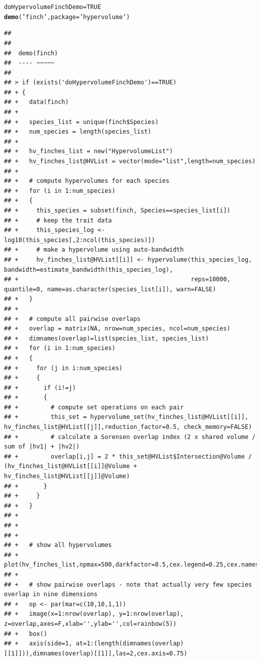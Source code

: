 \documentclass[12pt]{article}\usepackage[]{graphicx}\usepackage[]{color}
\makeatletter
\newcommand{\hlnum}[1]{\textcolor[rgb]{0.686,0.059,0.569}{#1}}%
\newcommand{\hlstr}[1]{\textcolor[rgb]{0.192,0.494,0.8}{#1}}%
\newcommand{\hlstd}[1]{\textcolor[rgb]{0.345,0.345,0.345}{#1}}%
\newcommand{\hlkwb}[1]{\textcolor[rgb]{0.69,0.353,0.396}{#1}}%
\newcommand{\hlkwc}[1]{\textcolor[rgb]{0.333,0.667,0.333}{#1}}%
\newcommand{\hlkwd}[1]{\textcolor[rgb]{0.737,0.353,0.396}{\textbf{#1}}}%
\newenvironment{kframe}{%
 \def\at@end@of@kframe{}%
 \ifinner\ifhmode%
  \def\at@end@of@kframe{\end{minipage}}%
  \begin{minipage}{\columnwidth}%
 \fi\fi%
 \def\FrameCommand##1{\hskip\@totalleftmargin \hskip-\fboxsep
 \colorbox{shadecolor}{##1}\hskip-\fboxsep
     \hskip-\linewidth \hskip-\@totalleftmargin \hskip\columnwidth}%
 \MakeFramed {\advance\hsize-\width
   \@totalleftmargin\z@ \linewidth\hsize
   \@setminipage}}%
 {\par\unskip\endMakeFramed%
 \at@end@of@kframe}
\newenvironment{knitrout}{}{} %
\makeatother
\begin{document}
\begin{knitrout}
\color{fgcolor}\begin{kframe}
\begin{alltt}
\hlstd{doHypervolumeFinchDemo}\hlkwb{=}\hlnum{TRUE}
\hlkwd{demo}\hlstd{(}\hlstr{'finch'}\hlstd{,} \hlkwc{package} \hlstd{=} \hlstr{'hypervolume'}\hlstd{)}
\end{alltt}
\begin{verbatim}
## 
## 
## 	demo(finch)
## 	---- ~~~~~
## 
## > if (exists('doHypervolumeFinchDemo')==TRUE)
## + {
## +   data(finch)
## +   
## +   species_list = unique(finch$Species)
## +   num_species = length(species_list)
## +   
## +   hv_finches_list = new("HypervolumeList")
## +   hv_finches_list@HVList = vector(mode="list",length=num_species)
## +   
## +   # compute hypervolumes for each species
## +   for (i in 1:num_species)
## +   {
## +     this_species = subset(finch, Species==species_list[i])
## +     # keep the trait data
## +     this_species_log <- log10(this_species[,2:ncol(this_species)])
## +     # make a hypervolume using auto-bandwidth
## +     hv_finches_list@HVList[[i]] <- hypervolume(this_species_log, bandwidth=estimate_bandwidth(this_species_log),
## +                                                reps=10000, quantile=0, name=as.character(species_list[i]), warn=FALSE)
## +   }
## +   
## +   # compute all pairwise overlaps
## +   overlap = matrix(NA, nrow=num_species, ncol=num_species)
## +   dimnames(overlap)=list(species_list, species_list)
## +   for (i in 1:num_species)
## +   {
## +     for (j in i:num_species)
## +     {
## +       if (i!=j)
## +       {
## +         # compute set operations on each pair
## +         this_set = hypervolume_set(hv_finches_list@HVList[[i]], hv_finches_list@HVList[[j]],reduction_factor=0.5, check_memory=FALSE)
## +         # calculate a Sorensen overlap index (2 x shared volume / sum of |hv1| + |hv2|)
## +         overlap[i,j] = 2 * this_set@HVList$Intersection@Volume / (hv_finches_list@HVList[[i]]@Volume + hv_finches_list@HVList[[j]]@Volume)
## +       }
## +     }   
## +   }
## +   
## + 
## +   
## +   # show all hypervolumes
## +   plot(hv_finches_list,npmax=500,darkfactor=0.5,cex.legend=0.25,cex.names=0.75)
## +   
## +   # show pairwise overlaps - note that actually very few species overlap in nine dimensions
## +   op <- par(mar=c(10,10,1,1))
## +   image(x=1:nrow(overlap), y=1:nrow(overlap), z=overlap,axes=F,xlab='',ylab='',col=rainbow(5))
## +   box()
## +   axis(side=1, at=1:(length(dimnames(overlap)[[1]])),dimnames(overlap)[[1]],las=2,cex.axis=0.75)

\end{verbatim}
\end{kframe}
\end{knitrout}
\end{document}
